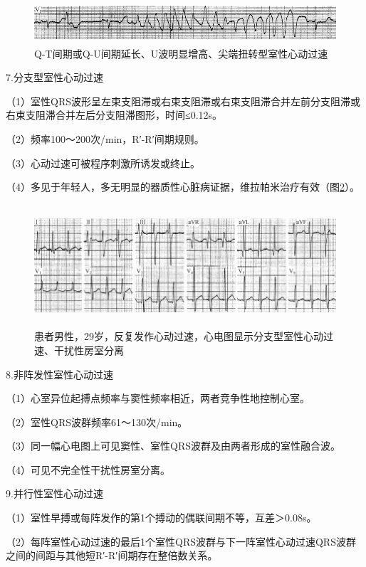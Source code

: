 \begin{figure}[!htbp]
 \centering
 \includegraphics[width=5.58333in,height=0.61458in]{./images/Image00539.jpg}
 \captionsetup{justification=centering}
 \caption{Q-T间期或Q-U间期延长、U波明显增高、尖端扭转型室性心动过速}
 \label{fig33-10}
  \end{figure} 

7.分支型室性心动过速

（1）室性QRS波形呈左束支阻滞或右束支阻滞或右束支阻滞合并左前分支阻滞或右束支阻滞合并左后分支阻滞图形，时间≤0.12s。

（2）频率100～200次/min，R′-R′间期规则。

（3）心动过速可被程序刺激所诱发或终止。

（4）多见于年轻人，多无明显的器质性心脏病证据，维拉帕米治疗有效（图\ref{fig33-11}）。

\begin{figure}[!htbp]
 \centering
 \includegraphics[width=5.77083in,height=1.79167in]{./images/Image00540.jpg}
 \captionsetup{justification=centering}
 \caption{患者男性，29岁，反复发作心动过速，心电图显示分支型室性心动过速、干扰性房室分离}
 \label{fig33-11}
  \end{figure} 

8.非阵发性室性心动过速

（1）心室异位起搏点频率与窦性频率相近，两者竞争性地控制心室。

（2）室性QRS波群频率61～130次/min。

（3）同一幅心电图上可见窦性、室性QRS波群及由两者形成的室性融合波。

（4）可见不完全性干扰性房室分离。

9.并行性室性心动过速

（1）室性早搏或每阵发作的第1个搏动的偶联间期不等，互差＞0.08s。

（2）每阵室性心动过速的最后1个室性QRS波群与下一阵室性心动过速QRS波群之间的间距与其他短R′-R′间期存在整倍数关系。

